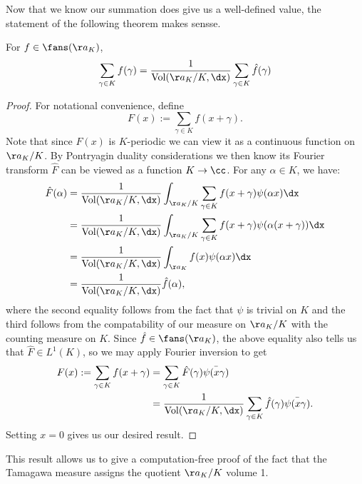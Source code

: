 \documentclass[11pt, x11names, openany]{book}
\begin{document}
Now that we know our summation does give us a well-defined value, the statement of the following theorem makes sensse.

\begin{theorem}
    \label{thm: Adelic Poisson Summation}
For $f \in \fans(\aa_K)$,
\begin{equation*}
    \sum_{\gamma \in K}f(\gamma) = \frac{1}{\vol(\aa_K/K, \dx)} \sum_{\gamma \in K} \hat{f}(\gamma)
\end{equation*}
\end{theorem}
\begin{proof}
For notational convenience, define
\begin{equation*}
    F(x) := \sum_{\gamma \in K} f(x + \gamma).
\end{equation*}
Note that since $F(x)$ is $K$-periodic we can view it as a continuous function on $\aa_K/K$. By Pontryagin duality considerations we then know its Fourier transform $\hat{F}$ can be viewed as a function $K \to \cc$. For any $\alpha \in K$, we have:
\begin{align*}
\hat{F}(\alpha) &= \frac{1}{\vol(\aa_K/K, \dx)}\int_{\aa_K/K} \sum_{\gamma \in K} f(x + \gamma) \psi(\alpha x) \dx\\
&=  \frac{1}{\vol(\aa_K/K, \dx)} \int_{\aa_K/K} \sum_{\gamma \in K}  f(x + \gamma) \psi(\alpha(x + \gamma)) \dx \\
&= \frac{1}{\vol(\aa_K/K, \dx)} \int_{\aa_K} f(x) \psi(\alpha x) \dx\\
&= \frac{1}{\vol(\aa_K/K, \dx)} \hat{f}(\alpha),
\end{align*}
where the second equality follows from the fact that $\psi$ is trivial on $K$ and the third follows from the compatability of our measure on $\aa_K/K$ with the counting measure on $K$. Since $\hat{f} \in \fans(\aa_K)$, the above equality also tells us that $\hat{F} \in L^1(K)$, so we may apply Fourier inversion to get
\begin{align*}
 F(x) := \sum_{\gamma \in K} f(x + \gamma) &= \sum_{\gamma \in K} \hat{F}(\gamma) \bar{\psi(x \gamma)}\\
 &= \frac{1}{\vol(\aa_K/K, \dx)} \sum_{\gamma \in K} \hat{f}(\gamma) \bar{\psi(x \gamma)}.
\end{align*}
Setting $x = 0$ gives us our desired result.
\end{proof}

This result allows us to give a computation-free proof of the fact that the Tamagawa measure assigns the quotient $\aa_K/K$ volume 1.
\end{document}
